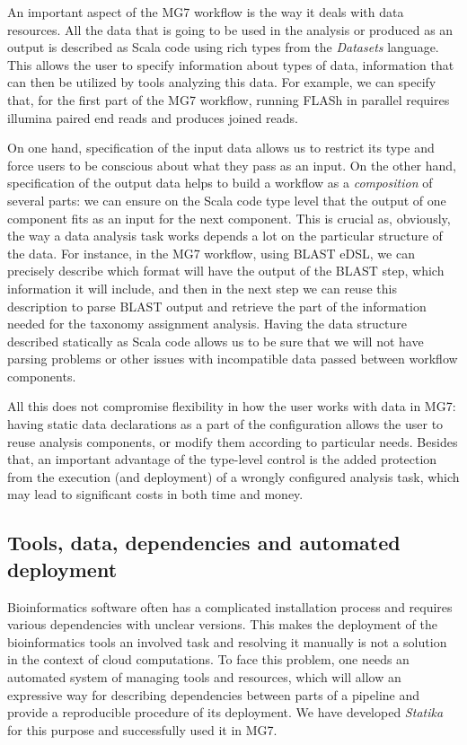 \documentclass[fleqn,10pt,lineno]{wlpeerj}
\begin{document}
An important aspect of the MG7 workflow is the way it deals with data
resources. All the data that is going to be used in the analysis or
produced as an output is described as Scala code using rich types from
the \emph{Datasets} language. This allows the user to specify
information about types of data, information that can then be utilized
by tools analyzing this data. For example, we can specify that, for the
first part of the MG7 workflow, running FLASh in parallel requires
illumina paired end reads and produces joined reads.

On one hand, specification of the input data allows us to restrict its
type and force users to be conscious about what they pass as an input.
On the other hand, specification of the output data helps to build a
workflow as a \emph{composition} of several parts: we can ensure on the
Scala code type level that the output of one component fits as an input
for the next component. This is crucial as, obviously, the way a data
analysis task works depends a lot on the particular structure of the
data. For instance, in the MG7 workflow, using BLAST eDSL, we can
precisely describe which format will have the output of the BLAST step,
which information it will include, and then in the next step we can
reuse this description to parse BLAST output and retrieve the part of
the information needed for the taxonomy assignment analysis. Having the
data structure described statically as Scala code allows us to be sure
that we will not have parsing problems or other issues with incompatible
data passed between workflow components.

All this does not compromise flexibility in how the user works with data
in MG7: having static data declarations as a part of the configuration
allows the user to reuse analysis components, or modify them according
to particular needs. Besides that, an important advantage of the
type-level control is the added protection from the execution (and
deployment) of a wrongly configured analysis task, which may lead to
significant costs in both time and money.

\subsection{Tools, data, dependencies and automated
deployment}\label{tools-data-dependencies-and-automated-deployment}

Bioinformatics software often has a complicated installation process and
requires various dependencies with unclear versions. This makes the
deployment of the bioinformatics tools an involved task and resolving it
manually is not a solution in the context of cloud computations. To face
this problem, one needs an automated system of managing tools and
resources, which will allow an expressive way for describing
dependencies between parts of a pipeline and provide a reproducible
procedure of its deployment. We have developed \emph{Statika} for this
purpose and successfully used it in MG7.
\end{document}
